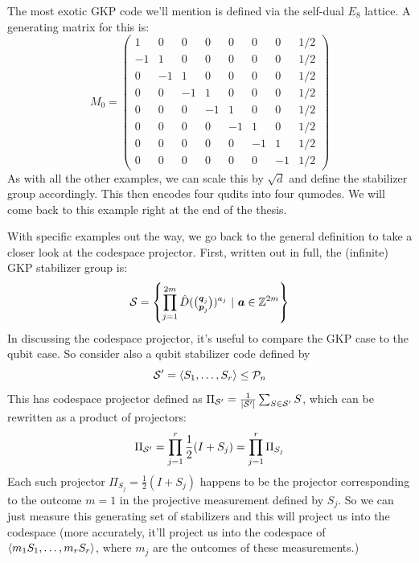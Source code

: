 \begin{example}\label{ex:E8_gkp}
    The most exotic GKP code we'll mention is defined via the self-dual $E_8$ lattice.
    A generating matrix for this is:
    \begin{equation}\label{eq:E8_lattice_generator_OG}
        M_0 =
        \begin{pmatrix}
            1 & 0 & 0 & 0 & 0 & 0 & 0 & 1/2 \\
            -1 & 1 & 0 & 0 & 0 & 0 & 0 & 1/2 \\
            0 & -1 & 1 & 0 & 0 & 0 & 0 & 1/2 \\
            0 & 0 & -1 & 1 & 0 & 0 & 0 & 1/2 \\
            0 & 0 & 0 & -1 & 1 & 0 & 0 & 1/2 \\
            0 & 0 & 0 & 0 & -1 & 1 & 0 & 1/2 \\
            0 & 0 & 0 & 0 & 0 & -1 & 1 & 1/2 \\
            0 & 0 & 0 & 0 & 0 & 0 & -1 & 1/2
        \end{pmatrix}
    \end{equation}
    As with all the other examples, we can scale this by $\sqrt{d}$ and define the stabilizer group accordingly.
    This then encodes four qudits into four qumodes.
    We will come back to this example right at the end of the thesis.
\end{example}

With specific examples out the way, we go back to the general definition to take a closer look at the codespace projector.
First, written out in full, the (infinite) GKP stabilizer group is:
\begin{equation}
    \mathcal{S} = \left\{ \prod_{j=1}^{2m} \hat{D}(\tbinom{\boldsymbol{q}_j}{\boldsymbol{p}_j})^{a_j} \ | \ \boldsymbol{a} \in \mathbb{Z}^{2m} \right\}
\end{equation}
In discussing the codespace projector, it's useful to compare the GKP case to the qubit case.
So consider also a qubit stabilizer code defined by
\begin{equation}
    \mathcal{S}' = \langle S_1, \ldots, S_r \rangle \leq \mathcal{P}_n
\end{equation}
This has codespace projector defined as $\Pi_{\mathcal{S}'} = \frac{1}{|\mathcal{S}'|}\sum_{S \in \mathcal{S}'} S$, which can be rewritten as a product of projectors:
\begin{equation}
    \Pi_{\mathcal{S}'} = \prod_{j = 1}^r \frac{1}{2}(I + S_j) = \prod_{j = 1}^r \Pi_{S_j}
\end{equation}
Each such projector $\Pi_{S_j} = \frac{1}{2}(I + S_j)$ happens to be the projector corresponding to the outcome $m=1$ in the projective measurement defined by $S_j$.
So we can just measure this generating set of stabilizers and this will project us into the codespace (more accurately, it'll project us into the codespace of $\langle m_1 S_1, \ldots, m_r S_r \rangle$, where $m_j$ are the outcomes of these measurements.)

